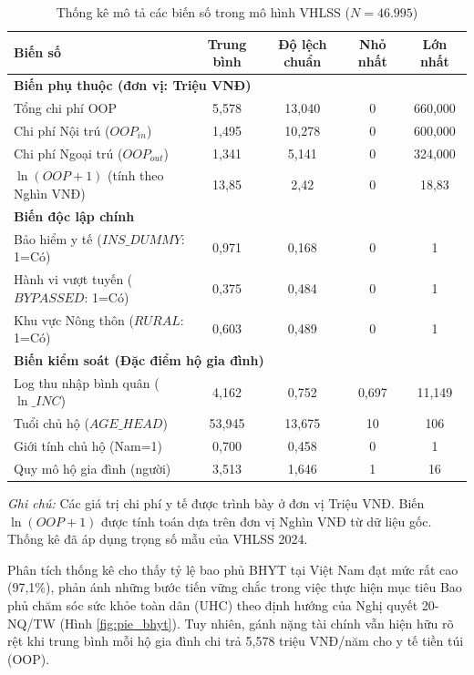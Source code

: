 \documentclass[12pt,a4paper]{article}
\begin{document}
\begin{table}[htbp]
	\centering
	\caption{Thống kê mô tả các biến số trong mô hình VHLSS ($N = 46.995$)}
	\label{tab:descriptive_stats}
	\begin{tabular}{lcccc}
		\toprule
		\textbf{Biến số} & \textbf{Trung bình} & \textbf{Độ lệch chuẩn} & \textbf{Nhỏ nhất} & \textbf{Lớn nhất} \\
		\midrule
		\multicolumn{5}{l}{\textbf{Biến phụ thuộc (đơn vị: Triệu VNĐ)}} \\
		Tổng chi phí OOP & 5,578 & 13,040 & 0 & 660,000 \\
		Chi phí Nội trú ($OOP_{in}$) & 1,495 & 10,278 & 0 & 600,000 \\
		Chi phí Ngoại trú ($OOP_{out}$) & 1,341 & 5,141 & 0 & 324,000 \\
		$\ln(OOP + 1)$ (tính theo Nghìn VNĐ) & 13,85 & 2,42 & 0 & 18,83 \\
		\midrule
		\multicolumn{5}{l}{\textbf{Biến độc lập chính}} \\
		Bảo hiểm y tế ($INS\_DUMMY$: 1=Có) & 0,971 & 0,168 & 0 & 1 \\
		Hành vi vượt tuyến ($BYPASSED$: 1=Có) & 0,375 & 0,484 & 0 & 1 \\
		Khu vực Nông thôn ($RURAL$: 1=Có) & 0,603 & 0,489 & 0 & 1 \\
		\midrule
		\multicolumn{5}{l}{\textbf{Biến kiểm soát (Đặc điểm hộ gia đình)}} \\
		Log thu nhập bình quân ($\ln\_INC$) & 4,162 & 0,752 & 0,697 & 11,149 \\
		Tuổi chủ hộ ($AGE\_HEAD$) & 53,945 & 13,675 & 10 & 106 \\
		Giới tính chủ hộ (Nam=1) & 0,700 & 0,458 & 0 & 1 \\
		Quy mô hộ gia đình (người) & 3,513 & 1,646 & 1 & 16 \\
		\bottomrule
	\end{tabular}
	\vspace{1ex}
	\parbox{14cm}{\footnotesize \textit{Ghi chú:} Các giá trị chi phí y tế được trình bày ở đơn vị Triệu VNĐ. Biến $\ln(OOP + 1)$ được tính toán dựa trên đơn vị Nghìn VNĐ từ dữ liệu gốc. Thống kê đã áp dụng trọng số mẫu của VHLSS 2024.}
\end{table}

Phân tích thống kê cho thấy tỷ lệ bao phủ BHYT tại Việt Nam đạt mức rất cao (97,1\%), phản ánh những bước tiến vững chắc trong việc thực hiện mục tiêu Bao phủ chăm sóc sức khỏe toàn dân (UHC) theo định hướng của Nghị quyết 20-NQ/TW (Hình \ref{fig:pie_bhyt}). Tuy nhiên, gánh nặng tài chính vẫn hiện hữu rõ rệt khi trung bình mỗi hộ gia đình chi trả 5,578 triệu VNĐ/năm cho y tế tiền túi (OOP). 
\end{document}
